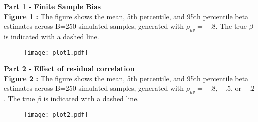 \documentclass{article}
\begin{document}
\textbf{Part 1 - Finite Sample Bias} \\\textbf{Figure 1 : }The figure shows the mean, 5th percentile, and 95th percentile beta estimates across B=250 simulated samples, generated with $\rho_{uv}=-.8$.  The true $\beta$ is indicated with a dashed line.
\begin{center}
 \begin{figure}[h!]
 \hspace{1cm}\texttt{[image: plot1.pdf]}\label{fig:plot1}
 \end{figure}
 \end{center}
\clearpage 
\textbf{Part 2 - Effect of residual correlation} \\\textbf{Figure 2 : }The figure shows the mean, 5th percentile, and 95th percentile beta estimates across B=250 simulated samples, generated with $\rho_{uv}=-.8$, $-.5$, or $-.2$.  The true $\beta$ is indicated with a dashed line.
\begin{center}
 \begin{figure}[h!]
 \texttt{[image: plot2.pdf]}\label{fig:plot2}
 \end{figure}
 \end{center}
\clearpage 
\end{document}

